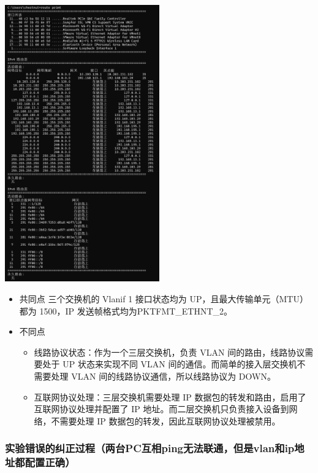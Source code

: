 \documentclass{article}
\begin{document}
\vspace{10pt}
\centerline{\includegraphics[width=0.5\textwidth]{3_1_images/21.png}}
\vspace{10pt}

\begin{itemize}
    \item 共同点
    三个交换机的 Vlanif 1 接口状态均为 UP，且最大传输单元（MTU）都为 1500，IP 发送帧格式均为PKTFMT\_ETHNT\_2。
    \item 不同点
    \begin{itemize}
        \item 线路协议状态：作为一个三层交换机，负责 VLAN 间的路由，线路协议需要处于 UP 状态来实现不同 VLAN 间的通信。而简单的接入层交换机不需要处理 VLAN 间的线路协议通信，所以线路协议为 DOWN。
        \item 互联网协议处理：三层交换机需要处理 IP 数据包的转发和路由，启用了互联网协议处理并配置了 IP 地址。而二层交换机只负责接入设备到网络，不需要处理 IP 数据包的转发，因此互联网协议处理被禁用。
    \end{itemize}
    

\end{itemize}

\subsubsection{实验错误的纠正过程（两台PC互相ping无法联通，但是vlan和ip地址都配置正确）}
\end{document}
